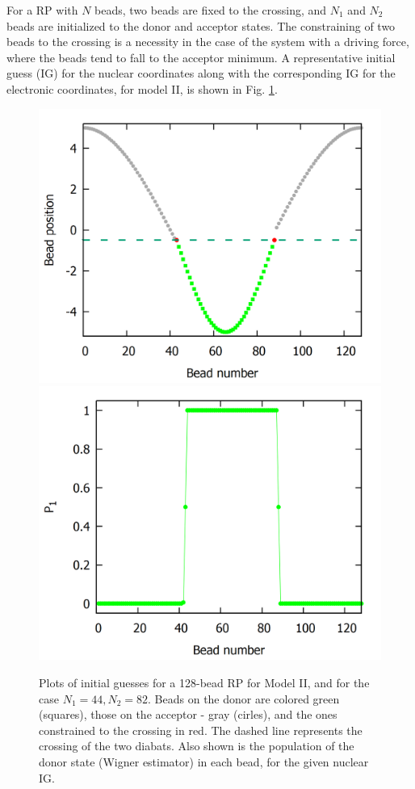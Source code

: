 \documentclass[%
 aip,
 jmp,%
 amsmath,amssymb,
reprint,%
]{revtex4-1}
\begin{document}
For a RP with $N$ beads, two beads are fixed to the crossing, and $N_{1}$ and $N_{2}$ beads are initialized to the donor and acceptor states. The constraining of two beads to the crossing is a necessity in the case of the system with a driving force, where the beads tend to fall to the acceptor minimum. 
A representative initial guess (IG) for the nuclear coordinates along with the corresponding IG for the electronic coordinates, for model II,  is shown in Fig. \ref{IGfig}.
\begin{figure}[h!]
\includegraphics[scale=0.16]{initGuess-128-44-84B-latest.png} \includegraphics[scale=0.16]{initGuess-pop-128-44-84B-2.png}
\caption{Plots of initial guesses for a 128-bead RP for Model II, and for the case $N_{1}=44,N_{2}=82$. Beads on the donor are colored green (squares), those on the acceptor - gray (cirles), and the ones constrained to the crossing in red. The dashed line represents the crossing of the two diabats. Also shown is the population of the donor state (Wigner estimator) in each bead, for the given nuclear IG.}\label{IGfig}
\end{figure}
\end{document}
